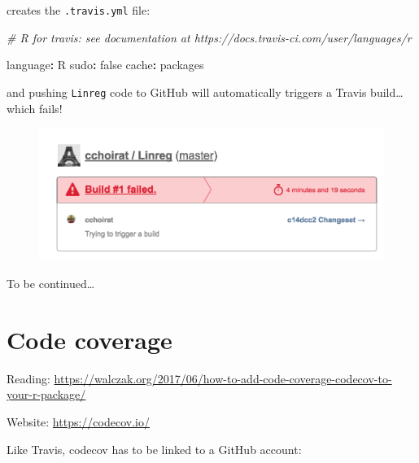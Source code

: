 \documentclass[]{book}
\newenvironment{Shaded}{\begin{snugshade}}{\end{snugshade}}
\newcommand{\StringTok}[1]{\textcolor[rgb]{0.31,0.60,0.02}{#1}}
\newcommand{\CommentTok}[1]{\textcolor[rgb]{0.56,0.35,0.01}{\textit{#1}}}
\newcommand{\OperatorTok}[1]{\textcolor[rgb]{0.81,0.36,0.00}{\textbf{#1}}}
\newcommand{\NormalTok}[1]{#1}
\theoremstyle{definition}
\theoremstyle{definition}
\theoremstyle{definition}
\theoremstyle{remark}
\begin{document}
creates the \texttt{.travis.yml} file:

\begin{Shaded}
\begin{Highlighting}[]
\CommentTok{# R for travis: see documentation at https://docs.travis-ci.com/user/languages/r}

\NormalTok{language}\OperatorTok{:}\StringTok{ }\NormalTok{R}
\NormalTok{sudo}\OperatorTok{:}\StringTok{ }\NormalTok{false}
\NormalTok{cache}\OperatorTok{:}\StringTok{ }\NormalTok{packages}
\end{Highlighting}
\end{Shaded}

and pushing \texttt{Linreg} code to GitHub will automatically triggers a
Travis build\ldots{} which fails!

\begin{figure}

{\centering \includegraphics[width=12.79in]{images/ch3_travis_failed_build} 

}

\end{figure}

To be continued\ldots{}

\section{Code coverage}\label{code-coverage}

Reading:
\url{https://walczak.org/2017/06/how-to-add-code-coverage-codecov-to-your-r-package/}

Website: \url{https://codecov.io/}

Like Travis, codecov has to be linked to a GitHub account:
\end{document}
